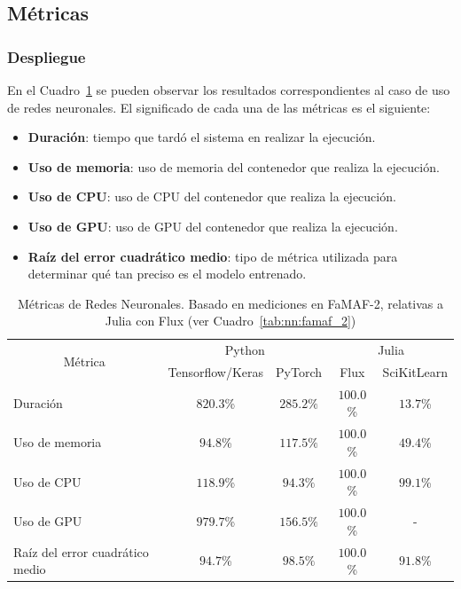 \documentclass[11pt]{article}
\let\Oldsubsection\subsection
\renewcommand{\subsection}{\FloatBarrier\Oldsubsection}
\let\Oldsubsubsection\subsubsection
\renewcommand{\subsubsection}{\FloatBarrier\Oldsubsubsection}
\begin{document}
\subsection{Métricas}

\subsubsection{Despliegue}

En el Cuadro~\ref{tab:nn:metrics} se pueden observar los resultados correspondientes al caso de uso de redes neuronales. El significado de cada una de las métricas es el siguiente:

\begin{itemize}
    \item \textbf{Duración}: tiempo que tardó el sistema en realizar la ejecución.
    \item \textbf{Uso de memoria}: uso de memoria del contenedor que realiza la ejecución.
    \item \textbf{Uso de CPU}: uso de CPU del contenedor que realiza la ejecución.
    \item \textbf{Uso de GPU}: uso de GPU del contenedor que realiza la ejecución.
    \item \textbf{Raíz del error cuadrático medio}: tipo de métrica utilizada para determinar qué tan preciso es el modelo entrenado.
\end{itemize}

\begin{table}[H]
\centering
\begin{tabular}{|l|cc|cc|}
\hline
\multicolumn{1}{|c|}{\multirow{2}{*}{Métrica}} & \multicolumn{2}{c|}{Python} & \multicolumn{2}{c|}{Julia} \\ \cline{2-5} 
\multicolumn{1}{|c|}{} & \multicolumn{1}{c|}{Tensorflow/Keras} & PyTorch & \multicolumn{1}{c|}{Flux} & SciKitLearn \\ \hline
Duración & \multicolumn{1}{c|}{$820.3$\%} & $285.2\%$& \multicolumn{1}{c|}{$100.0$\%} & \multicolumn{1}{c|}{$13.7$\%} \\ \hline
Uso de memoria & \multicolumn{1}{c|}{$94.8$\%} & $117.5\%$& \multicolumn{1}{c|}{$100.0$\%} & \multicolumn{1}{c|}{$49.4$\%} \\ \hline
Uso de CPU & \multicolumn{1}{c|}{$118.9$\%} & $94.3\%$& \multicolumn{1}{c|}{$100.0$\%} & \multicolumn{1}{c|}{$99.1$\%} \\ \hline
Uso de GPU & \multicolumn{1}{c|}{$979.7$\%} & $156.5\%$& \multicolumn{1}{c|}{$100.0$\%} & - \\ \hline
Raíz del error cuadrático medio & \multicolumn{1}{c|}{$94.7$\%} & $98.5\%$& \multicolumn{1}{c|}{$100.0$\%} & \multicolumn{1}{c|}{$91.8$\%} \\ \hline
\end{tabular}
\caption{Métricas de Redes Neuronales. Basado en mediciones en FaMAF-2, relativas a Julia con Flux (ver Cuadro~\ref{tab:nn:famaf_2})}
\label{tab:nn:metrics}
\end{table}
\end{document}
